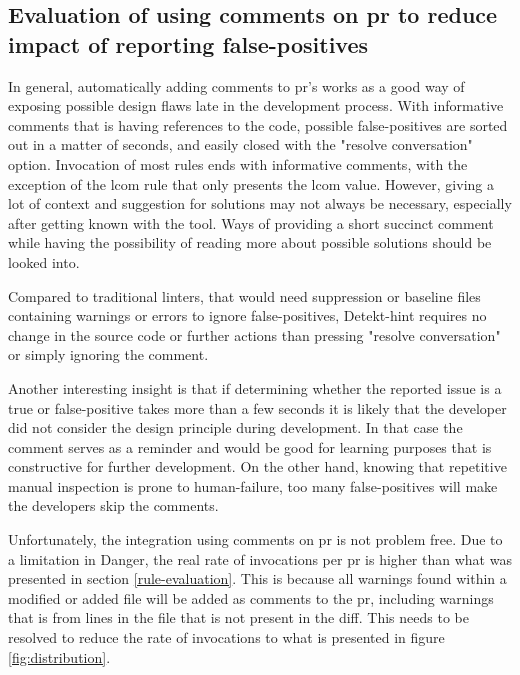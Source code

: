 \documentclass[pdftex,10pt,b5paper,twoside]{report}
\begin{document}
\begin{itemize}
\end{itemize}




\subsection{Evaluation of using comments on \gls{pr} to reduce impact of reporting false-positives}
\label{evaluation-comments}
In general, automatically adding comments to \gls{pr}'s works as a good way of exposing possible design flaws late in the development process. With informative comments that is having references to the code, possible false-positives are sorted out in a matter of seconds, and easily closed with the "resolve conversation" option. Invocation of most rules ends with informative comments, with the exception of the \gls{lcom} rule that only presents the \gls{lcom} value. However, giving a lot of context and suggestion for solutions may not always be necessary, especially after getting known with the tool. Ways of providing a short succinct comment while having the possibility of reading more about possible solutions should be looked into.

Compared to traditional linters, that would need suppression or baseline files containing warnings or errors to ignore false-positives, Detekt-hint requires no change in the source code or further actions than pressing "resolve conversation" or simply ignoring the comment.  

Another interesting insight is that if determining whether the reported issue is a true or false-positive takes more than a few seconds it is likely that the developer did not consider the design principle during development. In that case the comment serves as a reminder and would be good for learning purposes that is constructive for further development. On the other hand, knowing that repetitive manual inspection is prone to human-failure, too many false-positives will make the developers skip the comments.

Unfortunately, the integration using comments on \gls{pr} is not problem free. Due to a limitation in Danger, the real rate of invocations per \gls{pr} is higher than what was presented in section \ref{rule-evaluation}. This is because all warnings found within a modified or added file will be added as comments to the pr, including warnings that is from lines in the file that is not present in the diff. This needs to be resolved to reduce the rate of invocations to what is presented in figure \ref{fig:distribution}.
\end{document}
